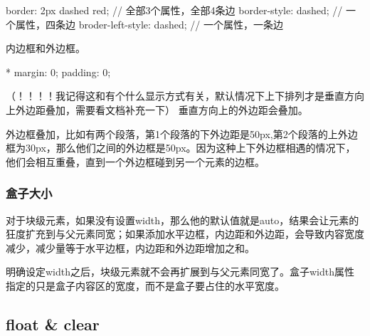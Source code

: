 \begin{CSS}[三个粒度]
{border: 2px dashed red;} // 全部3个属性，全部4条边
{border-style: dashed;} // 一个属性，四条边
{broder-left-style: dashed;} // 一个属性，一条边
\end{CSS}

内边框和外边框。


\begin{CSS}
* {margin: 0; padding: 0;}
\end{CSS}


（！！！！我记得这和有个什么显示方式有关，默认情况下上下排列才是垂直方向上外边距叠加，需要看文档补充一下）
垂直方向上的外边距会叠加。

外边框叠加，比如有两个段落，第1个段落的下外边距是50px,第2个段落的上外边框为30px，那么他们之间的外边框是50px。因为这种上下外边框相遇的情况下，他们会相互重叠，直到一个外边框碰到另一个元素的边框。

\subsubsection{盒子大小}

对于块级元素，如果没有设置width，那么他的默认值就是auto，结果会让元素的狂度扩充到与父元素同宽；如果添加水平边框，内边距和外边距，会导致内容宽度减少，减少量等于水平边框，内边距和外边距增加之和。

明确设定width之后，块级元素就不会再扩展到与父元素同宽了。盒子width属性指定的只是盒子内容区的宽度，而不是盒子要占住的水平宽度。


\subsection{float \& clear}

